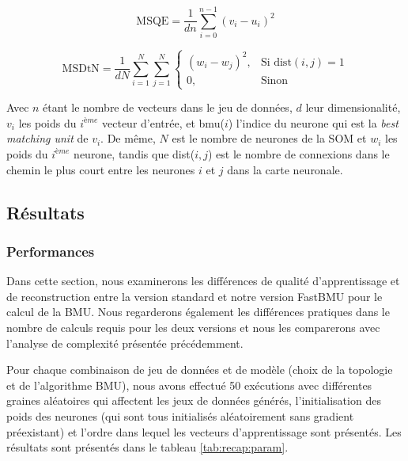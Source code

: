 	\begin{equation}
		\text{MSQE} = \frac{1}{dn} \sum_{i=0}^{n-1} (v_i - u_i)^2
	\end{equation}

	\begin{equation}
    	\text{MSDtN} = \frac{1}{dN} \sum_{i=1}^{N} \sum_{j=1}^{N} 
    	\begin{cases}
        	(w_i - w_j)^2,  & \text{Si dist}(i, j) = 1\\
        	0,              & \text{Sinon}
    	\end{cases}
	\end{equation}

	Avec $n$ étant le nombre de vecteurs dans le jeu de données, $d$ leur dimensionalité, $v_i$ les poids du $i^{ème}$ vecteur d'entrée, et bmu($i$) l'indice du neurone qui est la \textit{best matching unit} de $v_i$. De même, $N$ est le nombre de neurones de la SOM et $w_i$ les poids du $i^{ème}$ neurone, tandis que dist($i, j$) est le nombre de connexions dans le chemin le plus court entre les neurones $i$ et $j$ dans la carte neuronale.

	\subsection{Résultats}
	\subsubsection{Performances}

	Dans cette section, nous examinerons les différences de qualité d'apprentissage et de reconstruction entre la version standard et notre version FastBMU pour le calcul de la BMU. Nous regarderons également les différences pratiques dans le nombre de calculs requis pour les deux versions et nous les comparerons avec l'analyse de complexité présentée précédemment.

	Pour chaque combinaison de jeu de données et de modèle (choix de la topologie et de l'algorithme BMU), nous avons effectué 50 exécutions avec différentes graines aléatoires qui affectent les jeux de données générés, l'initialisation des poids des neurones (qui sont tous initialisés aléatoirement sans gradient préexistant) et l'ordre dans lequel les vecteurs d'apprentissage sont présentés. Les résultats sont présentés dans le tableau \ref{tab:recap:param}.

